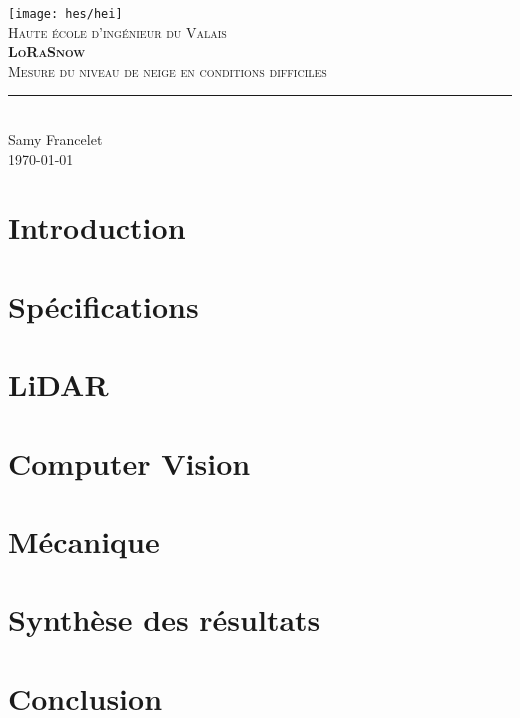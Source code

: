 \documentclass[11pt,titlepage]{report}
\begin{document}
\begin{titlepage}
	\centering
    \texttt{[image: hes/hei]}\\[1cm] 	%
    \textsc{\LARGE Haute école d'ingénieur du Valais}\\ \vspace{\fill}
	\textbf{\textsc{\fontsize{35}{35}\selectfont LoRaSnow}}\\ \vspace{\fill}
	\textsc{\LARGE Mesure du niveau de neige en conditions difficiles}\\[0.4cm]
	\rule{\linewidth}{0.2 mm} \\[0.5 cm]
	Samy Francelet \\
	\today
\end{titlepage}
\restoregeometry

\tableofcontents
\listoffigures
\listoftables

\chapter{Introduction}


\chapter{Spécifications}


\chapter{LiDAR}



\chapter{Computer Vision}




\chapter{Mécanique}


\chapter{Synthèse des résultats}


\chapter{Conclusion}


\printbibliography[heading=bibintoc]
\end{document}
